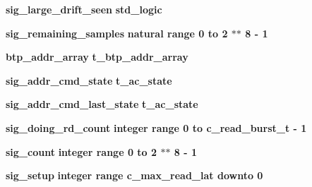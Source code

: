 \begin{DoxyCompactItemize}
\item 
{\bf sig\+\_\+large\+\_\+drift\+\_\+seen} {\bfseries \textcolor{comment}{std\+\_\+logic}\textcolor{vhdlchar}{ }} 
\item 
{\bf sig\+\_\+remaining\+\_\+samples} {\bfseries \textcolor{comment}{natural}\textcolor{vhdlchar}{ }\textcolor{vhdlchar}{ }\textcolor{vhdlchar}{ }\textcolor{keywordflow}{range}\textcolor{vhdlchar}{ }\textcolor{vhdlchar}{ } \textcolor{vhdldigit}{0} \textcolor{vhdlchar}{ }\textcolor{keywordflow}{to}\textcolor{vhdlchar}{ }\textcolor{vhdlchar}{ } \textcolor{vhdldigit}{2} \textcolor{vhdlchar}{$\ast$}\textcolor{vhdlchar}{$\ast$}\textcolor{vhdlchar}{ } \textcolor{vhdldigit}{8} \textcolor{vhdlchar}{-\/}\textcolor{vhdlchar}{ } \textcolor{vhdldigit}{1} \textcolor{vhdlchar}{ }} 
\item 
{\bf btp\+\_\+addr\+\_\+array} {\bfseries {\bfseries {\bf t\+\_\+btp\+\_\+addr\+\_\+array}} \textcolor{vhdlchar}{ }} 
\item 
{\bf sig\+\_\+addr\+\_\+cmd\+\_\+state} {\bfseries {\bfseries {\bf t\+\_\+ac\+\_\+state}} \textcolor{vhdlchar}{ }} 
\item 
{\bf sig\+\_\+addr\+\_\+cmd\+\_\+last\+\_\+state} {\bfseries {\bfseries {\bf t\+\_\+ac\+\_\+state}} \textcolor{vhdlchar}{ }} 
\item 
{\bf sig\+\_\+doing\+\_\+rd\+\_\+count} {\bfseries \textcolor{comment}{integer}\textcolor{vhdlchar}{ }\textcolor{vhdlchar}{ }\textcolor{vhdlchar}{ }\textcolor{keywordflow}{range}\textcolor{vhdlchar}{ }\textcolor{vhdlchar}{ } \textcolor{vhdldigit}{0} \textcolor{vhdlchar}{ }\textcolor{keywordflow}{to}\textcolor{vhdlchar}{ }\textcolor{vhdlchar}{ }\textcolor{vhdlchar}{ }\textcolor{vhdlchar}{ }{\bfseries {\bf c\+\_\+read\+\_\+burst\+\_\+t}} \textcolor{vhdlchar}{-\/}\textcolor{vhdlchar}{ } \textcolor{vhdldigit}{1} \textcolor{vhdlchar}{ }} 
\item 
{\bf sig\+\_\+count} {\bfseries \textcolor{comment}{integer}\textcolor{vhdlchar}{ }\textcolor{vhdlchar}{ }\textcolor{vhdlchar}{ }\textcolor{keywordflow}{range}\textcolor{vhdlchar}{ }\textcolor{vhdlchar}{ } \textcolor{vhdldigit}{0} \textcolor{vhdlchar}{ }\textcolor{keywordflow}{to}\textcolor{vhdlchar}{ }\textcolor{vhdlchar}{ } \textcolor{vhdldigit}{2} \textcolor{vhdlchar}{$\ast$}\textcolor{vhdlchar}{$\ast$}\textcolor{vhdlchar}{ } \textcolor{vhdldigit}{8} \textcolor{vhdlchar}{-\/}\textcolor{vhdlchar}{ } \textcolor{vhdldigit}{1} \textcolor{vhdlchar}{ }} 
\item 
{\bf sig\+\_\+setup} {\bfseries \textcolor{comment}{integer}\textcolor{vhdlchar}{ }\textcolor{vhdlchar}{ }\textcolor{vhdlchar}{ }\textcolor{keywordflow}{range}\textcolor{vhdlchar}{ }\textcolor{vhdlchar}{ }\textcolor{vhdlchar}{ }\textcolor{vhdlchar}{ }{\bfseries {\bf c\+\_\+max\+\_\+read\+\_\+lat}} \textcolor{vhdlchar}{ }\textcolor{keywordflow}{downto}\textcolor{vhdlchar}{ }\textcolor{vhdlchar}{ } \textcolor{vhdldigit}{0} \textcolor{vhdlchar}{ }} 

\end{DoxyCompactItemize}
